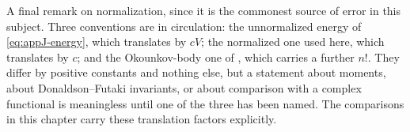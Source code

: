 A final remark on normalization, since it is the commonest source of error
in this subject.  Three conventions are in circulation: the unnormalized
energy of \eqref{eq:appJ-energy}, which translates by $cV$; the
normalized one used here, which translates by $c$; and the
Okounkov-body one of , which carries a
further $n!$.  They differ by positive constants and nothing else, but a
statement about moments, about Donaldson--Futaki invariants, or about
comparison with a complex functional is meaningless until one of the three
has been named.  The comparisons in this chapter carry these translation factors explicitly.
